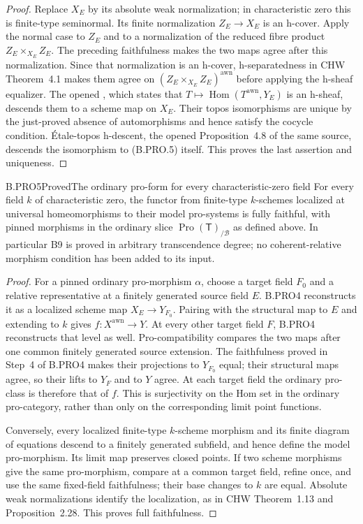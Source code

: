 \begin{proof}
Replace \(X_E\) by its absolute weak normalization; in
characteristic zero this is finite-type seminormal. Its finite
normalization \(Z_E\to X_E\) is an h-cover. Apply the normal
case to \(Z_E\) and to a normalization of the reduced fibre
product \(Z_E\times_{X_E}Z_E\). The preceding faithfulness
makes the two maps agree after this normalization. Since that
normalization is an h-cover, h-separatedness in CHW Theorem~4.1
makes them agree on \((Z_E\times_{X_E}Z_E)^{\mathrm{awn}}\)
before applying the h-sheaf equalizer. The opened
\citep[Theorem~4.1]{CarlsonHaineWolf2024}, which states that
\(T\mapsto\operatorname{Hom}(T^{\mathrm{awn}},Y_E)\)
is an h-sheaf, descends them to a scheme map on \(X_E\).
Their topos isomorphisms are unique by the just-proved absence
of automorphisms and hence satisfy the cocycle condition.
Étale-topos h-descent, the opened Proposition~4.8 of the same
source, descends the isomorphism to (B.PRO.5) itself. This proves
the last assertion and uniqueness.
\end{proof}

\begin{claim}{B.PRO5}{Proved}{The ordinary pro-form for every characteristic-zero field}
For every field \(k\) of characteristic zero, the functor from
finite-type \(k\)-schemes localized at universal homeomorphisms
to their model pro-systems is fully faithful, with pinned
morphisms in the ordinary slice
\(\operatorname{Pro}(\mathsf T)_{/\mathcal B}\) as defined
above. In particular B9 is proved in arbitrary transcendence
degree; no coherent-relative morphism condition has been added
to its input.
\end{claim}
\begin{proof}
For a pinned ordinary pro-morphism \(\alpha\), choose a target
field \(F_0\) and a relative representative at a finitely
generated source field \(E\). B.PRO4 reconstructs it as a
localized scheme map \(X_E\to Y_{F_0}\). Pairing with the
structural map to \(E\) and extending to \(k\) gives
\(f:X^{\mathrm{awn}}\to Y\). At every other target field
\(F\), B.PRO4 reconstructs that level as well. Pro-compatibility
compares the two maps after one common finitely generated
source extension. The faithfulness proved in Step~4 of B.PRO4
makes their projections to \(Y_{F_0}\) equal; their structural
maps agree, so their lifts to \(Y_F\) and to \(Y\) agree.
At each target field the ordinary pro-class is therefore that
of \(f\). This is surjectivity on the Hom set in the ordinary
pro-category, rather than only on the corresponding limit
point functions.

Conversely, every localized finite-type \(k\)-scheme morphism
and its finite diagram of equations descend to a finitely
generated subfield, and hence define the model pro-morphism.
Its limit map preserves closed points. If two scheme morphisms
give the same pro-morphism, compare at a common target field,
refine once, and use the same fixed-field faithfulness; their
base changes to \(k\) are equal. Absolute weak normalizations
identify the localization, as in CHW Theorem~1.13 and
Proposition~2.28. This proves full faithfulness.
\end{proof}

